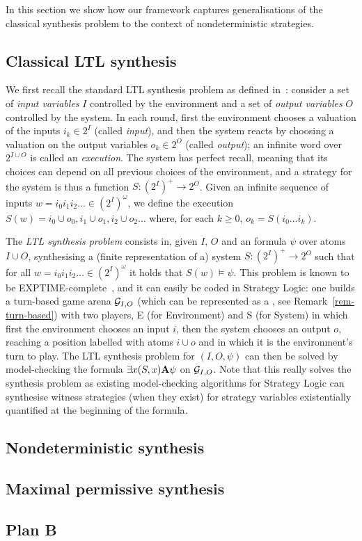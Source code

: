 In this section we show how our framework captures generalisations of
the classical \LTL synthesis problem to the context of nondeterministic strategies.

\subsection{Classical LTL synthesis}
\label{sec-ltl-synth}

We first recall the standard LTL synthesis problem as defined
in~\cite{pnueli1989synthesisshort}: consider a set of \emph{input
  variables} $I$ controlled by the environment and a set of
\emph{output variables} $O$ controlled by the system. In each round,
first the environment chooses a valuation of the inputs $i_k\in 2^I$
(called \emph{input}), and then the system reacts by choosing a
valuation on the output variables $o_k\in 2^O$ (called \emph{output});
an infinite word over $2^{I\cup O}$ is called an
\emph{execution}. The system has perfect recall, meaning that its
choices can depend on all previous choices of the environment, and a
strategy for the system is thus a function $S:(2^I)^+\to 2^O$. Given
an infinite sequence of inputs $w=i_0i_1i_2\ldots \in (2^I)^\omega$, we
define the execution $S(w)=i_0\cup o_0, i_1\cup o_1, i_2\cup o_2\ldots$ where,
for each $k\geq 0$, $o_k=S(i_0\ldots i_k)$.

The \emph{LTL synthesis problem} consists in,
given $I$, $O$ and an \LTL formula $\psi$ over atoms $I\cup O$,
synthesising a (finite representation of a) system $S:(2^I)^+\to 2^O$ such
that for all $w=i_0i_1i_2\ldots\in (2^I)^\omega$ it holds that $S(w)\models\psi$.
This problem is known to be
\2EXPTIME-complete~\cite{pnueli1989synthesisshort}, and it can easily
be coded in Strategy Logic: one builds a turn-based game arena $\CGS_{I,O}$ (which
can be represented as a \CGS, see Remark~\ref{rem-turn-based}) with
two players, E (for Environment) and S (for System) in
which first the environment chooses an input $i$, then the system chooses
an output $o$, reaching a position labelled with atoms $i\cup o$ and in which it is
the environment's turn to play. The LTL synthesis problem for $(I,O,\psi)$ can
then be solved by model-checking the \SL formula $\exists x (S,x) {\bf A}
\psi$ on $\CGS_{I,O}$. Note that this really solves the synthesis
problem as existing model-checking algorithms for Strategy Logic can
synthesise  witness strategies (when they exist) for strategy variables existentially
quantified at the beginning of the formula.

\subsection{Nondeterministic synthesis}
\label{sec-nd-synth}



\subsection{Maximal permissive synthesis}



\subsection{Plan B}


